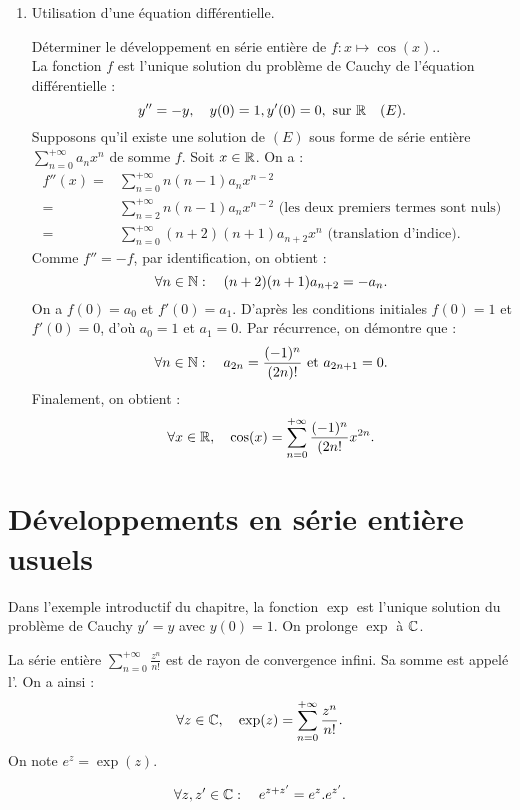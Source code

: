 \documentclass{book}
\begin{document}
\begin{enumerate}
\item Utilisation d'une équation différentielle.
\begin{Exemple} Déterminer le développement en série entière de $f : x \mapsto \cos(x).$. \\
La fonction $f$ est l'unique solution du problème de Cauchy de l'équation différentielle :
$$y''=-y, \quad  y(0)=1, y'(0)=0, \text{ sur } \mathbb{R}\quad (E).$$ 
Supposons qu'il existe une solution de $(E)$ sous forme de série entière $\sum_{n=0}^{+\infty} a_nx^n$ de somme $f$. Soit $x\in \mathbb{R}$. On a :
$$\begin{aligned} 
 f''(x)=&\sum_{n=0}^{+\infty} n(n-1) a_nx^{n-2}\\
  =& \sum_{n=2}^{+\infty} n(n-1) a_n x^{n-2} \text{ (les deux premiers termes sont nuls)}\\
 =&\sum_{n=0}^{+\infty} (n+2)(n+1) a_{n+2}x^{n} \text{ (translation d'indice)}.
 \end{aligned}$$
Comme $f''=-f$, par identification, on obtient : 
$$\forall n\in\mathbb{N} : \quad   (n+2)(n+1) a_{n+2} =-a_n.$$
On a $f(0)=a_0$ et $f'(0)=a_1$. D'après les conditions initiales  $f(0)=1$ et $f'(0)=0$, d'où $a_0=1$ et $a_1=0$. Par récurrence, on démontre que :
$$\forall n\in\mathbb{N} : \quad   a_{2n} =\frac{(-1)^n}{(2n)!}\text{ et }  a_{2n+1}=0.$$
Finalement, on obtient :
$$\forall x \in \mathbb{R},\quad \cos(x)=\sum_{n=0}^{+\infty}  \frac{(-1)^n}{(2n!}x^ {2n}.$$
\end{Exemple}
\end{enumerate}

\section{Développements en série entière usuels}

Dans l'exemple introductif du chapitre, la fonction $\exp$ est l'unique solution du problème de Cauchy $y' = y$ avec $y (0) = 1$. On prolonge $\exp$ à $\mathbb{C}$.
\begin{Definition}
La série entière $\sum_{n=0}^{+\infty} \frac{z^n}{n!}$ est de rayon de convergence infini. Sa somme est appelé l'. On a ainsi :
$$\forall z\in \mathbb{C},\quad \exp(z)=\sum_{n=0}^{+\infty}  \frac{z^n}{n!}.$$
On note $e^z=\exp(z).$
\end{Definition}
\begin{Proposition}
$$\forall z,z'\in \mathbb{C}:\quad e^{z+z'}=e^z.e^{z'}.$$
\end{Proposition}
\end{document}
